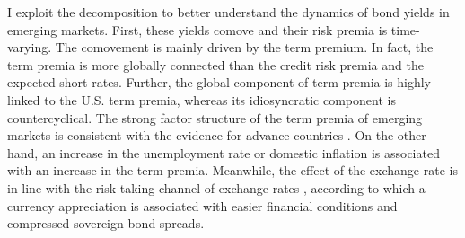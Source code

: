 {I exploit the decomposition to better understand the dynamics of bond yields in emerging markets.
First, these yields comove and their risk premia is time-varying.
The comovement is mainly driven by the term premium.
In fact, the term premia is more globally connected than the credit risk premia and the expected short rates.
Further, the global component of term premia is highly linked to the U.S. term premia, whereas its idiosyncratic component is countercyclical. 
The strong factor structure of the term premia of emerging markets is consistent with the evidence for advance countries \citep*{ACDM:2019}.
On the other hand, an increase in the unemployment rate or domestic inflation 
is associated with an increase in the term premia. Meanwhile, the effect of the exchange rate is in line with the risk-taking channel of exchange rates \citep*{HofmannShimShin:2019}, according to which a currency appreciation is associated with easier financial conditions and compressed sovereign bond spreads.




}
